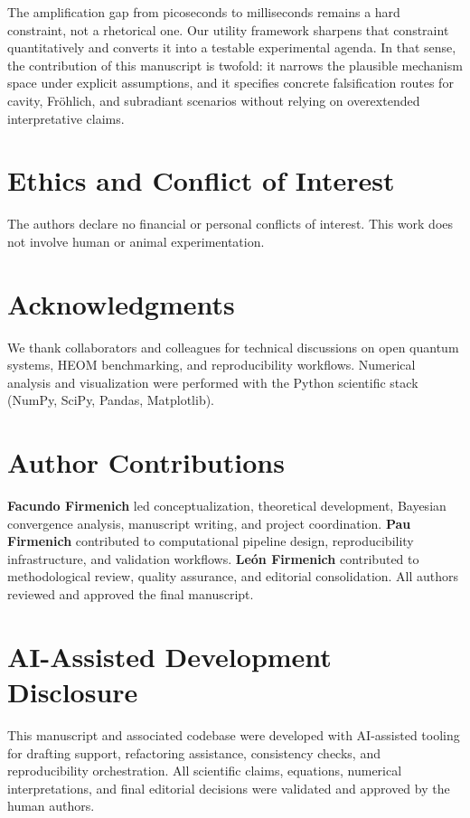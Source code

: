 \documentclass[twocolumn,10pt]{article}
\begin{document}
The amplification gap from picoseconds to milliseconds remains a hard
constraint, not a rhetorical one. Our utility framework sharpens that
constraint quantitatively and converts it into a testable experimental
agenda. In that sense, the contribution of this manuscript is twofold:
it narrows the plausible mechanism space under explicit assumptions, and
it specifies concrete falsification routes for cavity, Fr\"ohlich, and
subradiant scenarios without relying on overextended interpretative claims.


\section*{Ethics and Conflict of Interest}
The authors declare no financial or personal conflicts of interest. This work does not involve human or animal experimentation.

\section*{Acknowledgments}
We thank collaborators and colleagues for technical discussions on open quantum systems, HEOM benchmarking, and reproducibility workflows. Numerical analysis and visualization were performed with the Python scientific stack (NumPy, SciPy, Pandas, Matplotlib).

\section*{Author Contributions}
\textbf{Facundo Firmenich} led conceptualization, theoretical development, Bayesian convergence analysis, manuscript writing, and project coordination. \textbf{Pau Firmenich} contributed to computational pipeline design, reproducibility infrastructure, and validation workflows. \textbf{Le\'on Firmenich} contributed to methodological review, quality assurance, and editorial consolidation. All authors reviewed and approved the final manuscript.

\section*{AI-Assisted Development Disclosure}
This manuscript and associated codebase were developed with AI-assisted tooling for drafting support, refactoring assistance, consistency checks, and reproducibility orchestration. All scientific claims, equations, numerical interpretations, and final editorial decisions were validated and approved by the human authors.
\end{document}
